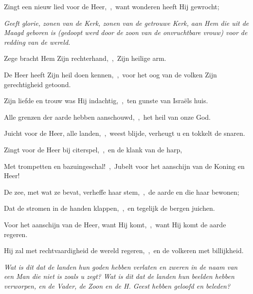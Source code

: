 \documentclass[12pt,twoside,a5paper]{article}
\begin{document}
\begin{halfparskip}

  Zingt een nieuw lied voor de Heer,~\sep\ want wonderen heeft Hij gewrocht;


  \liturgicallbracket{} \emph{Geeft glorie, zonen van de Kerk, zonen van de getrouwe Kerk, aan Hem die uit de Maagd geboren is (gedoopt werd door de zoon van de onvruchtbare vrouw) voor de redding van de wereld.}\liturgicalrbracket


  Zege bracht Hem Zijn rechterhand,~\sep\ Zijn heilige arm.

  De Heer heeft Zijn heil doen kennen,~\sep\ voor het oog van de volken Zijn gerechtigheid getoond.

  Zijn liefde en trouw was Hij indachtig,~\sep\ ten gunste van Israëls huis.

  Alle grenzen der aarde hebben aanschouwd,~\sep\ het heil van onze God.
\end{halfparskip}

\begin{halfparskip}

  Juicht voor de Heer, alle landen,~\sep\ weest blijde, verheugt u en tokkelt de snaren.

  Zingt voor de Heer bij citerspel,~\sep\ en de klank van de harp,

  Met trompetten en bazuingeschal!~\sep\ Jubelt voor het aanschijn van de Koning en Heer!

  De zee, met wat ze bevat, verheffe haar stem,~\sep\ de aarde en die haar bewonen;

  Dat de stromen in de handen klappen,~\sep\ en tegelijk de bergen juichen.

  Voor het aanschijn van de Heer, want Hij komt,~\sep\ want Hij komt de aarde regeren.

  Hij zal met rechtvaardigheid de wereld regeren,~\sep\ en de volkeren met billijkheid.

   \emph{Wat is dit dat de landen hun goden hebben verlaten en zweren in de naam van een Man die niet is zoals u zegt? Wat is dit dat de landen hun beelden hebben verworpen, en de Vader, de Zoon en de H. Geest hebben geloofd en beleden?}
\end{halfparskip}
\end{document}
